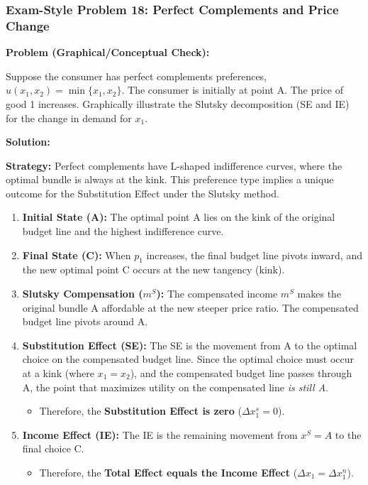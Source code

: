 \documentclass{article}
\begin{document}
\subsubsection*{Exam-Style Problem 18: Perfect Complements and Price Change}

\textbf{Problem (Graphical/Conceptual Check):}

Suppose the consumer has perfect complements preferences, $u(x_1, x_2) = \min\{x_1, x_2\}$. The consumer is initially at point A. The price of good 1 increases. Graphically illustrate the Slutsky decomposition (SE and IE) for the change in demand for $x_1$.

\vspace{1em}
\textbf{Solution:}

\vspace{1em}
\textbf{Strategy:} Perfect complements have L-shaped indifference curves, where the optimal bundle is always at the kink. This preference type implies a unique outcome for the Substitution Effect under the Slutsky method.

\begin{enumerate}
    \item \textbf{Initial State (A):} The optimal point A lies on the kink of the original budget line and the highest indifference curve.
    \item \textbf{Final State (C):} When $p_1$ increases, the final budget line pivots inward, and the new optimal point C occurs at the new tangency (kink).
    \item \textbf{Slutsky Compensation ($m^S$):} The compensated income $m^S$ makes the original bundle A affordable at the new steeper price ratio. The compensated budget line pivots around A.
    \item \textbf{Substitution Effect (SE):} The SE is the movement from A to the optimal choice on the compensated budget line. Since the optimal choice must occur at a kink (where $x_1=x_2$), and the compensated budget line passes through A, the point that maximizes utility on the compensated line \textit{is still A}.
    \begin{itemize}
        \item Therefore, the \textbf{Substitution Effect is zero} ($\Delta x_1^s = 0$).
    \end{itemize}
    \item \textbf{Income Effect (IE):} The IE is the remaining movement from $x^S=A$ to the final choice C.
    \begin{itemize}
        \item Therefore, the \textbf{Total Effect equals the Income Effect} ($\Delta x_1 = \Delta x_1^n$).
    \end{itemize}
\end{enumerate}
\end{document}
